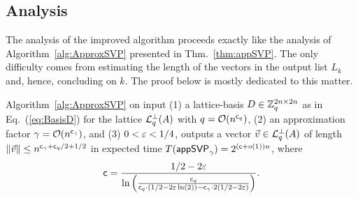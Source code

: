 \subsection{Analysis} \label{subsec:qAryImprovedAnalysis}

The analysis of the improved algorithm proceeds exactly like the analysis of Algorithm~\ref{alg:ApproxSVP} presented in Thm.~\ref{thm:appSVP}. The only difficulty comes from estimating the length of the vectors in the output list $L_k$ and, hence, concluding on $k$. The proof below is mostly dedicated to this matter.

\begin{thm} \label{thm:appSVPImproved}
	Algorithm~\ref{alg:ApproxSVP} on input (1) a lattice-basis $D \in {{\mathbb Z}}_q^{2n \times 2n}$ as in Eq.~(\ref{eq:BasisD}) for the lattice $\mathcal{L}_q^{\perp}(A)$ with $q = \mathcal{O}(n^{\mathsf{c}_q})$, (2) an approximation factor $\gamma = \mathcal{O}(n^{\mathsf{c}_{\gamma}})$, and (3) $0<\varepsilon<1/4$, outputs a vector $\vvec \in \qLATTp(A)$ of length $\|\vvec \| \leq n^{\cg+\cq/2 + 1/2}$ in expected time $T(\textsf{appSVP}_{\gamma}) = 2^{(\mathsf{c} + o(1))n}$, where
	\begin{equation} \label{eq:AppSVPImprovedRT}
	 \mathsf{c} = \frac{1/2 - 2\varepsilon}{\ln \left( \frac{\mathsf{c}_q}{ \mathsf{c}_q \cdot  (1/2 -2\varepsilon \ln(2)) -  \mathsf{c}_{\gamma} \cdot 2(1/2-2\varepsilon)} \right)}.
	 \end{equation}
\end{thm}

